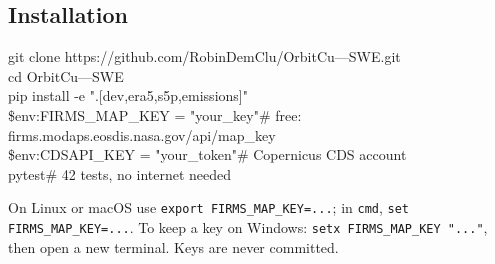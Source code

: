 \documentclass[10pt,a4paper]{article}
\newcommand{\code}[1]{\texttt{\small #1}}
\begin{document}
\subsection*{Installation}
\begin{tcolorbox}[colback=todobg,colframe=rule,boxrule=0.5pt,arc=2pt,title={\sffamily\bfseries Windows (PowerShell)},coltitle=ink,colbacktitle=rule]
\small\ttfamily
git clone https://github.com/RobinDemClu/OrbitCu---SWE.git\\
cd OrbitCu---SWE\\
pip install -e ".[dev,era5,s5p,emissions]"\\
\$env:FIRMS\_MAP\_KEY = "your\_key"\qquad \# free: firms.modaps.eosdis.nasa.gov/api/map\_key\\
\$env:CDSAPI\_KEY = "your\_token"\qquad \# Copernicus CDS account\\
pytest\qquad\qquad\qquad\qquad\qquad\quad \# 42 tests, no internet needed
\end{tcolorbox}
On Linux or macOS use \code{export FIRMS\_MAP\_KEY=...}; in \code{cmd}, \code{set FIRMS\_MAP\_KEY=...}. To keep a key on Windows: \code{setx FIRMS\_MAP\_KEY "..."}, then open a new terminal. Keys are never committed.
\end{document}
